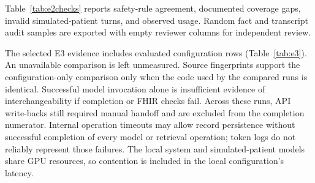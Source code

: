 \begin{table}[t]\centering
\caption{E2 provisional synthetic feasibility. Percentages include their actual
numerator/denominator; path comparison excludes explicitly classified early stops.
Times include the workflow through write-back.}
\label{tab:e2}
\scriptsize\setlength{\tabcolsep}{2pt}

\end{table}

\begin{table}[t]\centering
\caption{Additional E2 provisional software checks and observed usage. Rule
agreement is a functional test, not clinical sensitivity. Token and cost values
cover the bounded recorded calls only; local hardware cost is excluded.}
\label{tab:e2checks}
\footnotesize\setlength{\tabcolsep}{4pt}

\end{table}

Table~\ref{tab:e2checks} reports safety-rule agreement, documented coverage gaps,
invalid simulated-patient turns, and observed usage. Random fact and transcript
audit samples are exported with empty reviewer columns for independent review.

The selected E3 evidence includes \EThreeConfigurations{} evaluated configuration
rows (Table~\ref{tab:e3}). An unavailable comparison is left unmeasured. Source
fingerprints support the configuration-only comparison only when the code used
by the compared runs is identical. Successful model invocation alone is
insufficient evidence of interchangeability if completion or FHIR checks fail.
Across these runs, \EThreeHandoffs{} API write-backs still required manual handoff
and are excluded from the completion numerator. Internal operation timeouts may
allow record persistence without successful completion of every model or retrieval
operation; token logs do not reliably represent those failures.
The local system and simulated-patient models share GPU resources, so contention
is included in the local configuration's latency.

\begin{table}[t]\centering
\caption{E3 configuration comparisons, provisional. Code changes are measured
after the one-time framework extension. API costs marked by an asterisk are
partial recorded-call estimates, excluding hardware and omitted calls; their
sample sizes include only sessions contributing a cost estimate. Reported errors
include unverified resources after validator exceptions.}
\label{tab:e3}
\scriptsize\setlength{\tabcolsep}{1.8pt}

\end{table}

